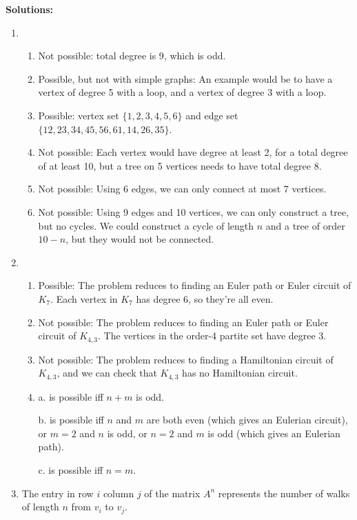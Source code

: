 \documentclass[a4paper,12pt]{article}
\begin{document}
\newpage

{\bf Solutions:}

\begin{enumerate}
\item
    \begin{enumerate}
    \item Not possible: total degree is 9, which is odd.
    \item Possible, but not with simple graphs: An example would be to have
    a vertex of degree 5 with a loop, and a vertex of degree 3 with a loop.
    \item Possible: vertex set $\{1, 2, 3, 4, 5, 6\}$ and edge set
    $\{12, 23, 34, 45, 56, 61, 14, 26, 35\}$.
    \item Not possible: Each vertex would have degree at least 2, for a total
    degree of at least 10, but a tree on 5 vertices needs to have total degree
    8.
    \item Not possible: Using 6 edges, we can only connect at most 7 vertices.
    \item Not possible: Using 9 edges and 10 vertices, we can only construct a
    tree, but no cycles. We could construct a cycle of length $n$ and a tree
    of order $10-n$, but they would not be connected.
    \end{enumerate}
\item
    \begin{enumerate}
    \item Possible: The problem reduces to finding an Euler path or Euler
    circuit of $K_7$. Each vertex in $K_7$ has degree 6, so they're all even.
    \item Not possible: The problem reduces to finding an Euler path or Euler
    circuit of $K_{4,3}$. The vertices in the order-4 partite set have degree 3.
    \item Not possible: The problem reduces to finding a Hamiltonian circuit of
    $K_{4,3}$, and we can check that $K_{4,3}$ has no Hamiltonian circuit.
    \item
    a. is possible iff $n+m$ is odd.

    b. is possible iff $n$ and $m$ are both even (which gives an Eulerian
        circuit), or $m = 2$ and $n$ is odd, or $n = 2$ and $m$ is odd (which
        gives an Eulerian path).

    c. is possible iff $n = m$.
    \end{enumerate}
\item
The entry in row $i$ column $j$ of the matrix $A^n$ represents the number of
walks of length $n$ from $v_i$ to $v_j$.
\end{enumerate}
\end{document}
